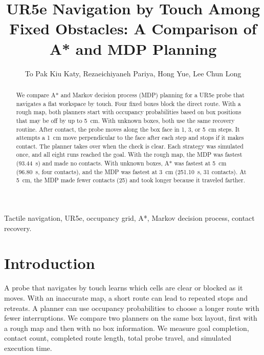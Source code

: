 \documentclass[letterpaper,journal]{IEEEtran}
\begin{document}
\pagestyle{courseproject}

\title{UR5e Navigation by Touch Among Fixed Obstacles: A Comparison of A* and MDP Planning}

\author{To Pak Kiu Katy, Rezaeichiyaneh Pariya, Hong Yue, Lee Chun Long}%

\maketitle
\thispagestyle{courseproject}

\begin{abstract}
We compare A* and Markov decision process (MDP) planning for a UR5e probe that navigates a flat workspace by touch. Four fixed boxes block the direct route. With a rough map, both planners start with occupancy probabilities based on box positions that may be off by up to 5~cm. With unknown boxes, both use the same recovery routine. After contact, the probe moves along the box face in 1, 3, or 5~cm steps. It attempts a 1~cm move perpendicular to the face after each step and stops if it makes contact. The planner takes over when the check is clear. Each strategy was simulated once, and all eight runs reached the goal. With the rough map, the MDP was fastest (93.44~s) and made no contacts. With unknown boxes, A* was fastest at 5~cm (96.80~s, four contacts), and the MDP was fastest at 3~cm (251.10~s, 31 contacts). At 5~cm, the MDP made fewer contacts (25) and took longer because it traveled farther.

\end{abstract}

\begin{IEEEkeywords}
Tactile navigation, UR5e, occupancy grid, A*, Markov decision process, contact recovery.
\end{IEEEkeywords}

\section{Introduction}

A probe that navigates by touch learns which cells are clear or blocked as it moves. With an inaccurate map, a short route can lead to repeated stops and retreats. A planner can use occupancy probabilities to choose a longer route with fewer interruptions. We compare two planners on the same box layout, first with a rough map and then with no box information. We measure goal completion, contact count, completed route length, total probe travel, and simulated execution time.
\end{document}

